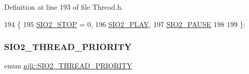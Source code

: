 Definition at line 193 of file Thread.\+h.


\begin{DoxyCode}
194   \{
195     \mbox{\hyperlink{namespacenjli_a2673f291a7156cb10a3c304580196555ab124aca454a99bef1a989eaacbcecec9}{SIO2\_STOP}} = 0,
196     \mbox{\hyperlink{namespacenjli_a2673f291a7156cb10a3c304580196555a9cb6f1b7593469f350b47bc71a1dc19d}{SIO2\_PLAY}},
197     \mbox{\hyperlink{namespacenjli_a2673f291a7156cb10a3c304580196555ad5a618c3425abc7e4dfd9b1567e4e615}{SIO2\_PAUSE}}
198 
199   \};
\end{DoxyCode}
\mbox{\label{namespacenjli_afafb6e52d47a71ae588f26e10f72e41a}} 
\subsubsection{\texorpdfstring{S\+I\+O2\+\_\+\+T\+H\+R\+E\+A\+D\+\_\+\+P\+R\+I\+O\+R\+I\+TY}{SIO2\_THREAD\_PRIORITY}}
{\footnotesize\ttfamily enum \mbox{\hyperlink{namespacenjli_afafb6e52d47a71ae588f26e10f72e41a}{njli\+::\+S\+I\+O2\+\_\+\+T\+H\+R\+E\+A\+D\+\_\+\+P\+R\+I\+O\+R\+I\+TY}}}

